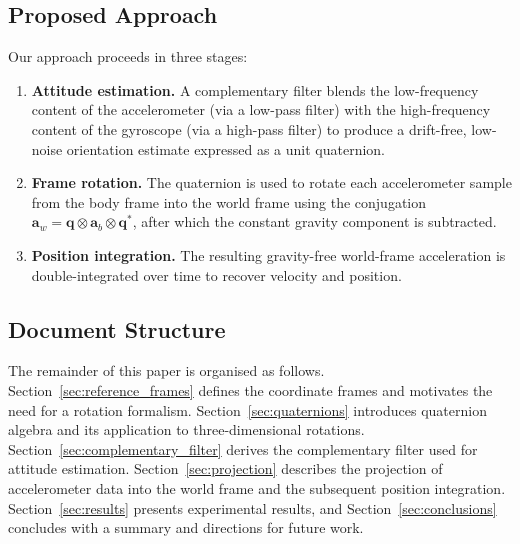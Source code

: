 
\subsection{Proposed Approach}
\label{sec:intro:approach}

Our approach proceeds in three stages:

\begin{enumerate}
  \item \textbf{Attitude estimation.} A complementary filter blends the
        low-frequency content of the accelerometer (via a low-pass filter) with
        the high-frequency content of the gyroscope (via a high-pass filter) to
        produce a drift-free, low-noise orientation estimate expressed as a unit
        quaternion.
  \item \textbf{Frame rotation.} The quaternion is used to rotate each
        accelerometer sample from the body frame into the world frame using the
        conjugation $\mathbf{a}_w = \mathbf{q} \otimes \mathbf{a}_b \otimes
        \mathbf{q}^*$, after which the constant gravity component is subtracted.
  \item \textbf{Position integration.} The resulting gravity-free
        world-frame acceleration is double-integrated over time to recover
        velocity and position.
\end{enumerate}


\subsection{Document Structure}
\label{sec:intro:structure}

The remainder of this paper is organised as follows.
Section~\ref{sec:reference_frames} defines the coordinate frames and motivates
the need for a rotation formalism.
Section~\ref{sec:quaternions} introduces quaternion algebra and its application
to three-dimensional rotations.
Section~\ref{sec:complementary_filter} derives the complementary filter used
for attitude estimation.
Section~\ref{sec:projection} describes the projection of accelerometer data
into the world frame and the subsequent position integration.
Section~\ref{sec:results} presents experimental results, and
Section~\ref{sec:conclusions} concludes with a summary and directions for future
work.
